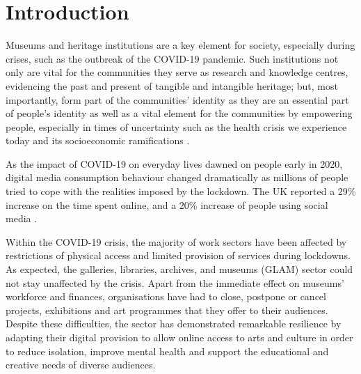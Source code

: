 \documentclass{egpubl}
\begin{document}
\section{Introduction}
\label{intro}
Museums and heritage institutions are a key element for society, especially during crises, such as the outbreak of the COVID-19 pandemic. Such institutions not only are vital for the communities they serve as research and knowledge centres, evidencing the past and present of tangible and intangible heritage; but, most importantly, form part of the communities' identity as they are an essential part of people's identity as well as a vital element for the communities by empowering people, especially in times of uncertainty such as the health crisis we experience today and its socioeconomic ramifications \cite{ICOM:2020}.

As the impact of COVID-19 on everyday lives dawned on people early in 2020, digital media consumption behaviour changed dramatically as millions of people tried to cope with the realities imposed by the lockdown. The UK reported a 29\% increase on the time spent online, and a 20\% increase of people using social media \cite{ofcom:2020}. 

Within the COVID-19 crisis, the majority of work sectors have been affected by restrictions of physical access and limited provision of services during lockdowns. As expected, the galleries, libraries, archives, and museums (GLAM) sector could not stay unaffected by the crisis. Apart from the immediate effect on museums' workforce and finances, organisations have had to close, postpone or cancel projects, exhibitions and art programmes that they offer to their audiences. Despite these difficulties, the sector has demonstrated remarkable resilience by adapting their digital provision to allow online access to arts and culture in order to reduce isolation, improve mental health and support the educational and creative needs of diverse audiences.
\end{document}
